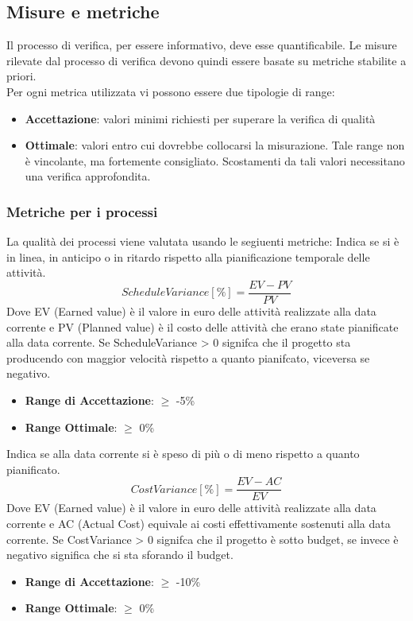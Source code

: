 \documentclass[12pt,a4paper]{article}
\begin{document}
\subsection{Misure e metriche}\label{metriche}
Il processo di verifica, per essere informativo, deve esse quantificabile. Le misure rilevate dal processo di verifica devono quindi essere basate su metriche stabilite a priori.\\
Per ogni metrica utilizzata vi possono essere due tipologie di range:
\begin{itemize}
\item \textbf{Accettazione}: valori minimi richiesti per superare la verifica di qualità
\item \textbf{Ottimale}: valori entro cui dovrebbe collocarsi la misurazione. Tale range non è vincolante, ma fortemente consigliato. Scostamenti da tali valori necessitano una verifica approfondita.
\end{itemize}
\subsubsection{Metriche per i processi}\label{metriche_processi}
La qualità dei processi viene valutata usando le segiuenti metriche:
Indica se si è in linea, in anticipo o in ritardo rispetto alla pianificazione temporale delle attività.
\[ScheduleVariance [\%] = \frac{EV - PV}{PV}\]
Dove EV (Earned value) è il valore in euro delle attività realizzate alla data corrente e PV (Planned value) è il costo delle attività che erano state pianificate alla data corrente.
Se ScheduleVariance > 0 signifca che il progetto sta producendo con maggior velocità rispetto a quanto pianifcato, viceversa se negativo.
\begin{itemize}
\item \textbf{Range di Accettazione}: $\geq$ -5\%
\item \textbf{Range Ottimale}: $\geq$ 0\%
\end{itemize}
Indica se alla data corrente si è speso di più o di meno rispetto a quanto pianificato.
\[CostVariance [\%] = \frac{EV - AC}{EV}\]
Dove EV (Earned value) è il valore in euro delle attività realizzate alla data corrente e AC (Actual Cost) equivale ai costi effettivamente sostenuti alla data corrente.
Se CostVariance > 0 signifca che il progetto è sotto budget, se invece è negativo significa che si sta sforando il budget.
\begin{itemize}
\item \textbf{Range di Accettazione}: $\geq$ -10\%
\item \textbf{Range Ottimale}: $\geq$ 0\%
\end{itemize}
\end{document}
